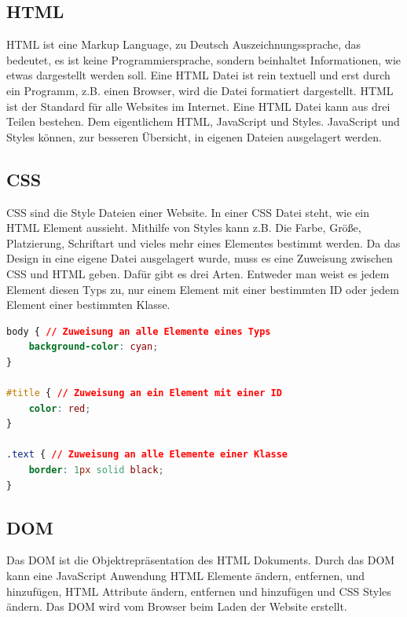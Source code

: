 \subsection{HTML}
\label{sec:vor-html}
\ac{HTML} ist eine Markup Language, zu Deutsch Auszeichnungssprache, das bedeutet, es ist keine Programmiersprache, sondern beinhaltet Informationen, wie etwas dargestellt werden soll. Eine \ac{HTML} Datei ist rein textuell und erst durch ein Programm, z.B. einen Browser, wird die Datei formatiert dargestellt. \ac{HTML} ist der Standard für alle Websites im Internet. Eine \ac{HTML} Datei kann aus drei Teilen bestehen. Dem eigentlichem \ac{HTML}, JavaScript und Styles. JavaScript und Styles können, zur besseren Übersicht, in eigenen Dateien ausgelagert werden.

\subsection{CSS}
\ac{CSS} sind die Style Dateien einer Website. In einer \ac{CSS} Datei steht, wie ein \ac{HTML} Element aussieht. Mithilfe von Styles kann z.B. Die Farbe, Größe, Platzierung, Schriftart und vieles mehr eines Elementes bestimmt werden. Da das Design in eine eigene Datei ausgelagert wurde, muss es eine Zuweisung zwischen \ac{CSS} und \ac{HTML} geben. Dafür gibt es drei Arten. Entweder man weist es jedem Element diesen Typs zu, nur einem Element mit einer bestimmten ID oder jedem Element einer bestimmten Klasse.

\begin{lstlisting}[caption=Zuweisen von Design an HTML,language=CSS,label=CSS-Beispiel]
body { // Zuweisung an alle Elemente eines Typs
	background-color: cyan;
}

#title { // Zuweisung an ein Element mit einer ID
	color: red;
}

.text { // Zuweisung an alle Elemente einer Klasse
	border: 1px solid black;
}
\end{lstlisting}


\subsection{DOM}
\label{sec:vor-dom}
Das \ac{DOM} ist die Objektrepräsentation des \ac{HTML} Dokuments. Durch das \ac{DOM} kann eine JavaScript Anwendung \ac{HTML} Elemente ändern, entfernen, und hinzufügen, \ac{HTML} Attribute ändern, entfernen und hinzufügen und \ac{CSS} Styles ändern. Das \ac{DOM} wird vom Browser beim Laden der Website erstellt. 

